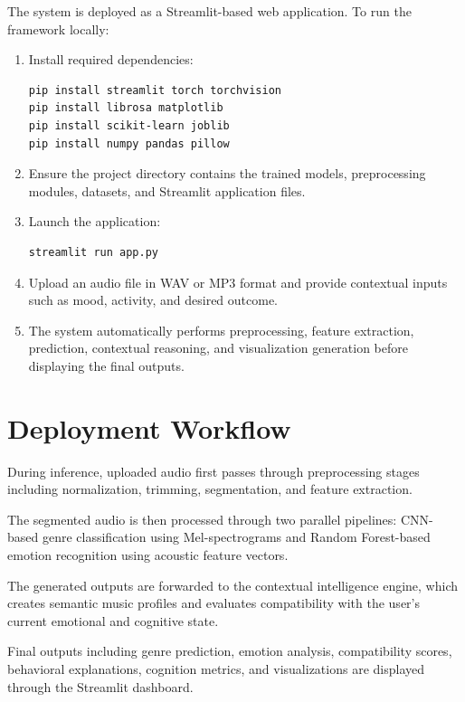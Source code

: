 \documentclass[12pt,a4paper]{report}
\begin{document}
The system is deployed as a Streamlit-based web application. To run the framework locally:

\begin{enumerate}

\item Install required dependencies:

\begin{verbatim}
pip install streamlit torch torchvision
pip install librosa matplotlib
pip install scikit-learn joblib
pip install numpy pandas pillow
\end{verbatim}

\item Ensure the project directory contains the trained models, preprocessing modules, datasets, and Streamlit application files.

\item Launch the application:

\begin{verbatim}
streamlit run app.py
\end{verbatim}

\item Upload an audio file in WAV or MP3 format and provide contextual inputs such as mood, activity, and desired outcome.

\item The system automatically performs preprocessing, feature extraction, prediction, contextual reasoning, and visualization generation before displaying the final outputs.

\end{enumerate}

\section{Deployment Workflow}

During inference, uploaded audio first passes through preprocessing stages including normalization, trimming, segmentation, and feature extraction.

The segmented audio is then processed through two parallel pipelines:
CNN-based genre classification using Mel-spectrograms and Random Forest-based emotion recognition using acoustic feature vectors.

The generated outputs are forwarded to the contextual intelligence engine, which creates semantic music profiles and evaluates compatibility with the user’s current emotional and cognitive state.

Final outputs including genre prediction, emotion analysis, compatibility scores, behavioral explanations, cognition metrics, and visualizations are displayed through the Streamlit dashboard.
\end{document}
